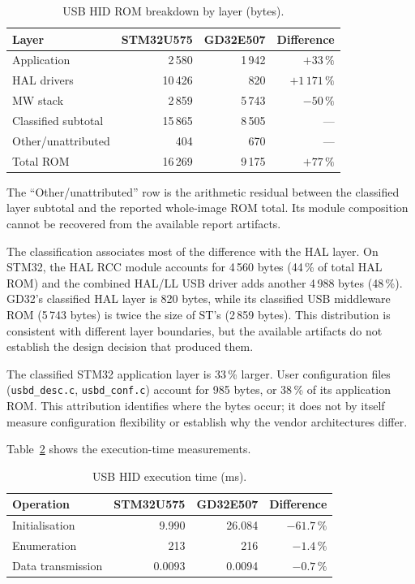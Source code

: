 \begin{table}[H]
  \centering
  \caption{USB HID ROM breakdown by layer (bytes).}
  \label{tab:gd32-usb-hid-rom}
  \begin{tabular}{l r r r}
    \toprule
    \textbf{Layer} & \textbf{STM32U575} & \textbf{GD32E507} & \textbf{Difference} \\
    \midrule
    Application    & 2\,580  & 1\,942 & $+33\,\%$ \\
    HAL drivers    & 10\,426 & 820    & $+1\,171\,\%$ \\
    MW stack       & 2\,859  & 5\,743 & $-50\,\%$ \\
    Classified subtotal & 15\,865 & 8\,505 & --- \\
    Other/unattributed  & 404 & 670 & --- \\
    \midrule
    Total ROM       & 16\,269 & 9\,175 & $+77\,\%$ \\
    \bottomrule
  \end{tabular}
\end{table}

The ``Other/unattributed'' row is the arithmetic residual between the classified layer
subtotal and the reported whole-image ROM total. Its module composition cannot be recovered
from the available report artifacts.

The classification associates most of the difference with the HAL layer. On STM32, the HAL RCC module accounts for
4\,560 bytes (44\,\% of total HAL ROM) and the combined HAL/LL USB driver adds another
4\,988 bytes (48\,\%). GD32's classified HAL layer is 820 bytes, while its classified USB
middleware ROM (5\,743 bytes) is twice the size of ST's (2\,859 bytes). This distribution is
consistent with different layer boundaries, but the available artifacts do not establish
the design decision that produced them.

The classified STM32 application layer is 33\,\% larger. User configuration files
(\texttt{usbd\_desc.c}, \texttt{usbd\_conf.c}) account for 985 bytes, or 38\,\% of its
application ROM. This attribution identifies where the bytes occur; it does not by itself
measure configuration flexibility or establish why the vendor architectures differ.

Table~\ref{tab:gd32-usb-hid-exec} shows the execution-time measurements.

\begin{table}[H]
  \centering
  \caption{USB HID execution time (ms).}
  \label{tab:gd32-usb-hid-exec}
  \begin{tabular}{l r r r}
    \toprule
    \textbf{Operation} & \textbf{STM32U575} & \textbf{GD32E507} & \textbf{Difference} \\
    \midrule
    Initialisation      & 9.990  & 26.084 & $-61.7\,\%$ \\
    Enumeration         & 213    & 216    & $-1.4\,\%$ \\
    Data transmission   & 0.0093 & 0.0094 & $-0.7\,\%$ \\
    \bottomrule
  \end{tabular}
\end{table}

